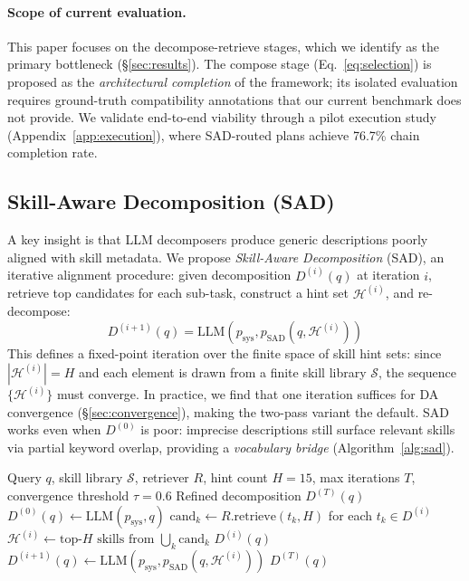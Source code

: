 \documentclass[11pt]{article}
\begin{document}
\paragraph{Scope of current evaluation.}
This paper focuses on the decompose-retrieve stages, which we identify as the primary bottleneck (\S\ref{sec:results}).
The compose stage (Eq.~\ref{eq:selection}) is proposed as the \emph{architectural completion} of the framework; its isolated evaluation requires ground-truth compatibility annotations that our current benchmark does not provide.
We validate end-to-end viability through a pilot execution study (Appendix~\ref{app:execution}), where SAD-routed plans achieve 76.7\% chain completion rate.

\subsection{Skill-Aware Decomposition (SAD)}
\label{sec:sad}

A key insight is that LLM decomposers produce generic descriptions poorly aligned with skill metadata.
We propose \emph{Skill-Aware Decomposition} (SAD), an iterative alignment procedure: given decomposition $D^{(i)}(q)$ at iteration $i$, retrieve top candidates for each sub-task, construct a hint set $\mathcal{H}^{(i)}$, and re-decompose:
\begin{equation}
D^{(i+1)}(q) = \text{LLM}(p_{\text{sys}}, p_{\text{SAD}}(q, \mathcal{H}^{(i)}))
\end{equation}
This defines a fixed-point iteration over the finite space of skill hint sets: since $|\mathcal{H}^{(i)}| = H$ and each element is drawn from a finite skill library $\mathcal{S}$, the sequence $\{\mathcal{H}^{(i)}\}$ must converge.
In practice, we find that one iteration suffices for DA convergence (\S\ref{sec:convergence}), making the two-pass variant the default.
SAD works even when $D^{(0)}$ is poor: imprecise descriptions still surface relevant skills via partial keyword overlap, providing a \emph{vocabulary bridge} (Algorithm~\ref{alg:sad}).

\begin{algorithm}[t]
\caption{Iterative Skill-Aware Decomposition (SAD)}
\label{alg:sad}
\small
\begin{algorithmic}[1]
\REQUIRE Query $q$, skill library $\mathcal{S}$, retriever $R$, hint count $H{=}15$, max iterations $T$, convergence threshold $\tau{=}0.6$
\ENSURE Refined decomposition $D^{(T)}(q)$
\STATE $D^{(0)}(q) \gets \text{LLM}(p_{\text{sys}}, q)$ 
  \STATE $\text{cand}_k \gets R.\text{retrieve}(t_k, H)$ for each $t_k \in D^{(i)}$
  \STATE $\mathcal{H}^{(i)} \gets \text{top-}H\text{ skills from } \bigcup_k \text{cand}_k$
    \RETURN $D^{(i)}(q)$ 
  \ENDIF
  \STATE $D^{(i+1)}(q) \gets \text{LLM}(p_{\text{sys}}, p_{\text{SAD}}(q, \mathcal{H}^{(i)}))$
\ENDFOR
\RETURN $D^{(T)}(q)$
\end{algorithmic}
\end{algorithm}
\end{document}
